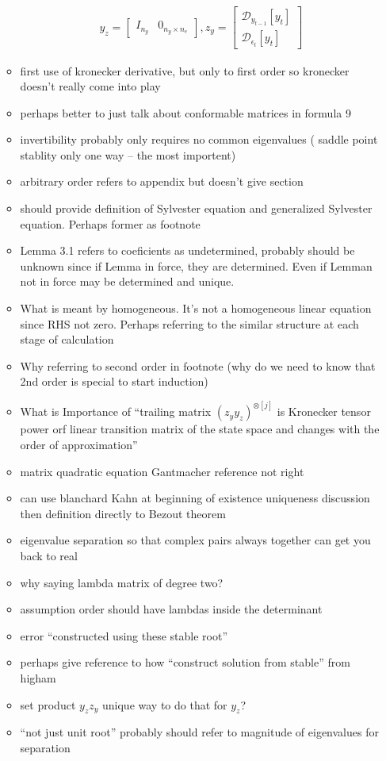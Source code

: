 \documentclass[12pt]{article}
\newcommand{\ny}{n_y}
\begin{document}
\begin{itemize}
\begin{itemize}
    \begin{gather*}
y_z= 
      \begin{bmatrix}
       I_{\ny} &0_{\ny \times n_e}
      \end{bmatrix},
z_y=      \begin{bmatrix}
        \mathcal{D}_{y_{t-1}}[y_t] \\ \mathcal{D}_{\epsilon_{t}}[y_t]
      \end{bmatrix}
    \end{gather*}
  \item first use of kronecker derivative, but only to first order so kronecker doesn't really come into play
  \item perhaps better to just talk about conformable matrices in formula 9
  \item invertibility probably only requires no common eigenvalues  ( saddle point stablity only one way -- the most importent)
  \item arbitrary order refers to appendix but doesn't give section

\item should provide definition of Sylvester equation and generalized Sylvester equation.  Perhaps former as footnote
\item Lemma 3.1 refers to coeficients as undetermined, probably should be unknown since if Lemma in force, they are determined.  Even if Lemman not in force may be determined and unique.
\item What is meant by homogeneous.  It's not a homogeneous linear equation since RHS not zero. Perhaps referring to the similar structure at each stage of
calculation
\item Why referring to second order in footnote  (why do we need to know that 2nd order is special to start induction)
\item What is Importance of ``trailing matrix $(z_yy_z)^{\otimes[j]}$ is Kronecker tensor power orf linear transition matrix of the state space and changes with the order of approximation''
\item matrix quadratic equation Gantmacher reference not right
\item can use blanchard Kahn at beginning of existence uniqueness discussion then definition directly to Bezout theorem
\item eigenvalue separation so that complex pairs always together can get you back to real
\item why saying lambda matrix of degree two?
\item assumption order should have lambdas inside the determinant
\item error ``constructed using these stable root''
\item perhaps give reference to how ``construct solution from stable'' from higham
\item set product $y_z z_y$ unique way to do that for $y_z$?
\item ``not just unit root'' probably should refer to magnitude of eigenvalues for separation
  \end{itemize}


\end{itemize}
\end{document}
